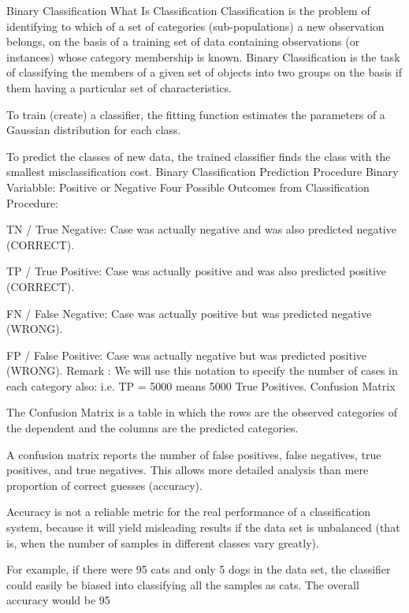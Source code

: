 \documentclass[a4paper,12pt]{article}
\begin{document}
Binary Classification
What Is Classification
Classification is the problem of identifying to which of a set of categories (sub-populations) a new
observation belongs, on the basis of a training set of data containing observations (or instances)
whose category membership is known. Binary Classification is the task of classifying the members of
a given set of objects into two groups on the basis if them having a particular set of characteristics.
\item  To train (create) a classifier, the fitting function estimates the parameters of a Gaussian
distribution for each class.
\item  To predict the classes of new data, the trained classifier finds the class with the smallest
misclassification cost.
Binary Classification Prediction Procedure
Binary Variabble: Positive or Negative
Four Possible Outcomes from Classification Procedure:
\item  TN / True Negative: Case was actually negative and was also predicted negative
(CORRECT).
\item  TP / True Positive: Case was actually positive and was also predicted positive (CORRECT).
\item  FN / False Negative: Case was actually positive but was predicted negative
(WRONG).
\item  FP / False Positive: Case was actually negative but was predicted positive (WRONG).
Remark : We will use this notation to specify the number of cases in each category also: i.e. TP
= 5000 means 5000 True Positives.
Confusion Matrix
\item  The Confusion Matrix is a table in which the rows are the observed categories of the dependent
and the columns are the predicted categories.
\item  A confusion matrix reports the number of false positives, false negatives, true positives, and
true negatives. This allows more detailed analysis than mere proportion of correct guesses
(accuracy).
\item  Accuracy is not a reliable metric for the real performance of a classification system, because
it will yield misleading results if the data set is unbalanced (that is, when the number of
samples in different classes vary greatly).
\item  For example, if there were 95 cats and only 5 dogs in the data set, the classifier could
easily be biased into classifying all the samples as cats. The overall accuracy would be
95%
\end{document}
